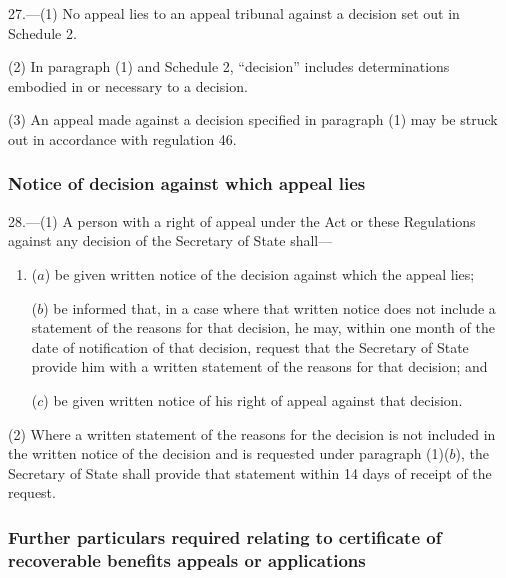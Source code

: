 \documentclass[12pt,a4paper]{article}
\begin{document}
27.—(1) No appeal lies to an appeal tribunal against a decision set out in Schedule 2.

(2) In paragraph (1) and Schedule 2, “decision” includes determinations embodied in or necessary to a decision.

(3) An appeal made against a decision specified in paragraph (1) may be struck out in accordance with regulation 46.

\subsubsection[28. Notice of decision against which appeal lies]{Notice of decision against which appeal lies}

28.—(1) A person with a right of appeal under the Act or these Regulations against any decision of the Secretary of State shall—
\begin{enumerate}\item[]
($a$) be given written notice of the decision against which the appeal lies;

($b$) be informed that, in a case where that written notice does not include a statement of the reasons for that decision, he may, within one month of the date of notification of that decision, request that the Secretary of State provide him with a written statement of the reasons for that decision; and

($c$) be given written notice of his right of appeal against that decision.
\end{enumerate}

(2) Where a written statement of the reasons for the decision is not included in the written notice of the decision and is requested under paragraph (1)($b$), the Secretary of State shall provide that statement within 14 days of receipt of the request.

\subsubsection[29. Further particulars required relating to certificate of recoverable benefits appeals or applications]{Further particulars required relating to certificate of recoverable benefits appeals or applications}
\end{document}
